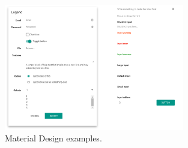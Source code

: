 
\begin{figure}[H]
	\centering
    \includegraphics[width=0.7\textwidth]{images/design/bootstrap_material_design}
    \caption[Material Design examples]{Material Design examples\protect\footnotemark.}
    \label{fig:material_design_examples}
\end{figure}

